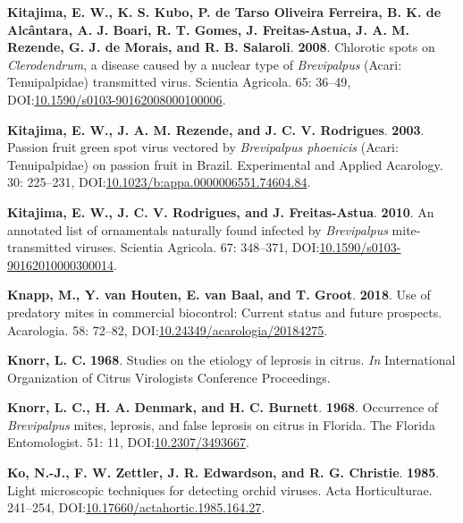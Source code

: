 \documentclass[12pt,final,CPage]{ufthesis}
\newlength{\cslhangindent}
\newenvironment{CSLReferences}[2] %
{%
	\setlength{\parindent}{0pt}
	\ifodd #1 \everypar{\setlength{\hangindent}{\cslhangindent}}\ignorespaces\fi
	\ifnum #2 > 0
	\setlength{\parskip}{#2\baselineskip}
	\fi
}%
{}
\begin{document}
{\begin{CSLReferences}{1}{0}
  \leavevmode{}%
  \textbf{Kitajima, E. W., K. S. Kubo, P. de Tarso Oliveira Ferreira, B. K. de Alcântara, A. J. Boari, R. T. Gomes, J. Freitas-Astua, J. A. M. Rezende, G. J. de Morais, and R. B. Salaroli}. \textbf{2008}. Chlorotic spots on {\emph{Clerodendrum}}, a disease caused by a nuclear type of {\emph{Brevipalpus}} ({Acari}: {Tenuipalpidae}) transmitted virus. Scientia Agricola. 65: 36--49, DOI:\href{https://doi.org/10.1590/s0103-90162008000100006}{10.1590/s0103-90162008000100006}.

  \leavevmode{}%
  \textbf{Kitajima, E. W., J. A. M. Rezende, and J. C. V. Rodrigues}. \textbf{2003}. {Passion fruit green spot virus} vectored by {\emph{Brevipalpus phoenicis}} ({Acari}: {Tenuipalpidae}) on passion fruit in {Brazil}. Experimental and Applied Acarology. 30: 225--231, DOI:\href{https://doi.org/10.1023/b:appa.0000006551.74604.84}{10.1023/b:appa.0000006551.74604.84}.

  \leavevmode{}%
  \textbf{Kitajima, E. W., J. C. V. Rodrigues, and J. Freitas-Astua}. \textbf{2010}. An annotated list of ornamentals naturally found infected by {\emph{Brevipalpus}} mite-transmitted viruses. Scientia Agricola. 67: 348--371, DOI:\href{https://doi.org/10.1590/s0103-90162010000300014}{10.1590/s0103-90162010000300014}.

  \leavevmode{}%
  \textbf{Knapp, M., Y. van Houten, E. van Baal, and T. Groot}. \textbf{2018}. Use of predatory mites in commercial biocontrol: Current status and future prospects. Acarologia. 58: 72--82, DOI:\href{https://doi.org/10.24349/acarologia/20184275}{10.24349/acarologia/20184275}.

  \leavevmode{}%
  \textbf{Knorr, L. C.} \textbf{1968}. Studies on the etiology of leprosis in citrus. \emph{In} International Organization of Citrus Virologists Conference Proceedings.

  \leavevmode{}%
  \textbf{Knorr, L. C., H. A. Denmark, and H. C. Burnett}. \textbf{1968}. Occurrence of {\emph{Brevipalpus}} mites, leprosis, and false leprosis on citrus in {Florida}. The Florida Entomologist. 51: 11, DOI:\href{https://doi.org/10.2307/3493667}{10.2307/3493667}.

  \leavevmode{}%
  \textbf{Ko, N.-J., F. W. Zettler, J. R. Edwardson, and R. G. Christie}. \textbf{1985}. Light microscopic techniques for detecting orchid viruses. Acta Horticulturae. 241--254, DOI:\href{https://doi.org/10.17660/actahortic.1985.164.27}{10.17660/actahortic.1985.164.27}.


\end{CSLReferences}}
\end{document}
